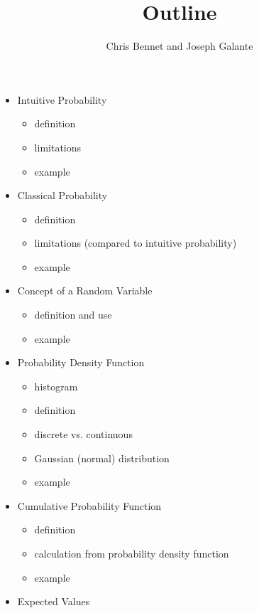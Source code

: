 \documentclass{article}
\title{Outline}
\author{Chris Bennet and Joseph Galante}
\date{}
\begin{document}
\maketitle

\begin{itemize}
\item Intuitive Probability

	\begin{itemize}
	\item definition
	\item limitations
	\item example
	\end{itemize}

\item Classical Probability
	\begin{itemize}
	\item definition
	\item limitations (compared to intuitive probability)
	\item example
 	\end{itemize}

\item Concept of a Random Variable

	\begin{itemize}
	\item definition and use
	\item example
	\end{itemize}

\item Probability Density Function

	\begin{itemize}
	\item histogram
	\item definition
	\item discrete vs. continuous
	\item Gaussian (normal) distribution
	\item example
	\end{itemize}

\item Cumulative Probability Function

	\begin{itemize}
	\item definition
	\item calculation from probability density function
	\item example
	\end{itemize}

\item Expected Values


\end{itemize}
\end{document}

